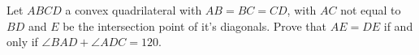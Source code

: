 Let $ABCD$ a convex quadrilateral with $AB=BC=CD$,  with $AC$ not equal to $BD$ and $E$ be the intersection point of it's diagonals. Prove that $AE=DE$ if and only if $\angle BAD+\angle ADC = 120$.